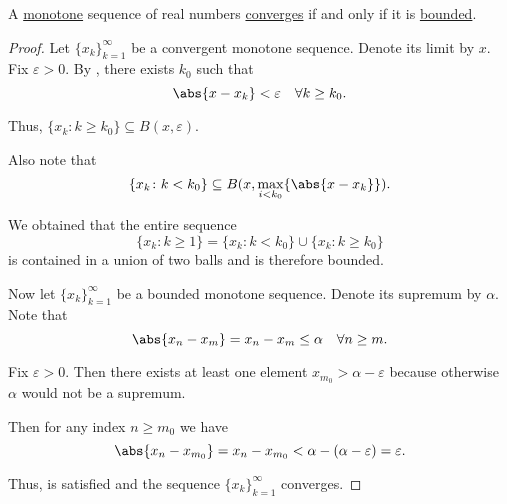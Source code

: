 \begin{proposition}\label{thm:real_monotone_sequence_converges_iff_bounded}
  A \hyperref[def:partially_ordered_set/homomorphism]{monotone} sequence of real numbers \hyperref[def:net_convergence/limit]{converges} if and only if it is \hyperref[def:metric_space/bounded_sequence]{bounded}.
\end{proposition}
\begin{proof}
  \SufficiencySubProof Let \( \{ x_k \}_{k=1}^\infty \) be a convergent monotone sequence. Denote its limit by \( x \). Fix \( \varepsilon > 0 \). By , there exists \( k_0 \) such that
  \begin{equation*}
    \abs{x - x_k} < \varepsilon \quad\forall k \geq k_0.
  \end{equation*}

  Thus, \( \{ x_k \colon k \geq k_0 \} \subseteq B(x, \varepsilon) \).

  Also note that
  \begin{equation*}
    \{ x_k \colon k < k_0 \} \subseteq B(x, \max_{i < k_0} \{ \abs{x - x_k} \}).
  \end{equation*}

  We obtained that the entire sequence
  \begin{equation*}
    \{ x_k \colon k \geq 1 \} = \{ x_k \colon k < k_0 \} \cup \{ x_k \colon k \geq k_0 \}
  \end{equation*}
  is contained in a union of two balls and is therefore bounded.

  \NecessitySubProof Now let \( \{ x_k \}_{k=1}^\infty \) be a bounded monotone sequence. Denote its supremum by \( \alpha \). Note that
  \begin{equation*}
    \abs{x_n - x_m} = x_n - x_m \leq \alpha \quad\forall n \geq m.
  \end{equation*}

  Fix \( \varepsilon > 0 \). Then there exists at least one element \( x_{m_0} > \alpha - \varepsilon \) because otherwise \( \alpha \) would not be a supremum.

  Then for any index \( n \geq m_0 \) we have
  \begin{equation*}
    \abs{x_n - x_{m_0}} = x_n - x_{m_0} < \alpha - (\alpha - \varepsilon) = \varepsilon.
  \end{equation*}

  Thus,  is satisfied and the sequence \( \{ x_k \}_{k=1}^\infty \) converges.
\end{proof}
